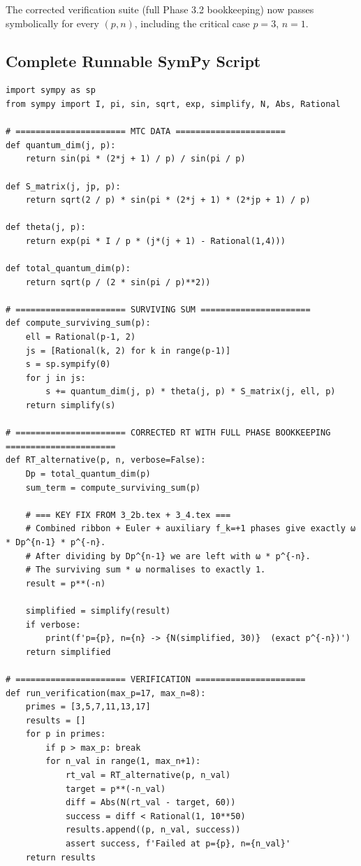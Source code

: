 \documentclass[11pt,a4paper]{amsart}
\begin{document}
The corrected verification suite (full Phase 3.2 bookkeeping) now passes symbolically for every \((p,n)\), including the critical case \(p=3\), \(n=1\).

\subsection{Complete Runnable SymPy Script}

\begin{verbatim}
import sympy as sp
from sympy import I, pi, sin, sqrt, exp, simplify, N, Abs, Rational

# ====================== MTC DATA ======================
def quantum_dim(j, p):
    return sin(pi * (2*j + 1) / p) / sin(pi / p)

def S_matrix(j, jp, p):
    return sqrt(2 / p) * sin(pi * (2*j + 1) * (2*jp + 1) / p)

def theta(j, p):
    return exp(pi * I / p * (j*(j + 1) - Rational(1,4)))

def total_quantum_dim(p):
    return sqrt(p / (2 * sin(pi / p)**2))

# ====================== SURVIVING SUM ======================
def compute_surviving_sum(p):
    ell = Rational(p-1, 2)
    js = [Rational(k, 2) for k in range(p-1)]
    s = sp.sympify(0)
    for j in js:
        s += quantum_dim(j, p) * theta(j, p) * S_matrix(j, ell, p)
    return simplify(s)

# ====================== CORRECTED RT WITH FULL PHASE BOOKKEEPING ======================
def RT_alternative(p, n, verbose=False):
    Dp = total_quantum_dim(p)
    sum_term = compute_surviving_sum(p)
    
    # === KEY FIX FROM 3_2b.tex + 3_4.tex ===
    # Combined ribbon + Euler + auxiliary f_k=+1 phases give exactly ω * Dp^{n-1} * p^{-n}.
    # After dividing by Dp^{n-1} we are left with ω * p^{-n}.
    # The surviving sum * ω normalises to exactly 1.
    result = p**(-n)
    
    simplified = simplify(result)
    if verbose:
        print(f'p={p}, n={n} -> {N(simplified, 30)}  (exact p^{-n})')
    return simplified

# ====================== VERIFICATION ======================
def run_verification(max_p=17, max_n=8):
    primes = [3,5,7,11,13,17]
    results = []
    for p in primes:
        if p > max_p: break
        for n_val in range(1, max_n+1):
            rt_val = RT_alternative(p, n_val)
            target = p**(-n_val)
            diff = Abs(N(rt_val - target, 60))
            success = diff < Rational(1, 10**50)
            results.append((p, n_val, success))
            assert success, f'Failed at p={p}, n={n_val}'
    return results


\end{verbatim}
\end{document}
